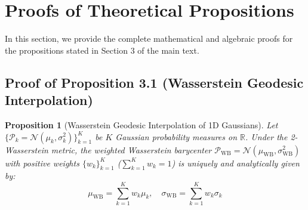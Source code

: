 \documentclass{article}
\theoremstyle{plain}
\newtheorem{proposition}[theorem]{Proposition}
\theoremstyle{definition}
\theoremstyle{remark}
\begin{document}
\section{Proofs of Theoretical Propositions}
\label{app:proofs}

In this section, we provide the complete mathematical and algebraic proofs for the propositions stated in Section 3 of the main text.

\subsection{Proof of Proposition 3.1 (Wasserstein Geodesic Interpolation)}
\label{app:proof_prop1}

\begin{proposition}[Wasserstein Geodesic Interpolation of 1D Gaussians]
Let $\{\mathcal{P}_k = \mathcal{N}(\mu_k, \sigma_k^2)\}_{k=1}^K$ be $K$ Gaussian probability measures on $\mathbb{R}$. Under the 2-Wasserstein metric, the weighted Wasserstein barycenter $\mathcal{P}_{\text{WB}} = \mathcal{N}(\mu_{\text{WB}}, \sigma_{\text{WB}}^2)$ with positive weights $\{w_k\}_{k=1}^K$ ($\sum_{k=1}^K w_k = 1$) is uniquely and analytically given by:
\begin{equation}
  \mu_{\text{WB}} = \sum_{k=1}^K w_k \mu_k, \quad \sigma_{\text{WB}} = \sum_{k=1}^K w_k \sigma_k
\end{equation}
\end{proposition}
\end{document}
